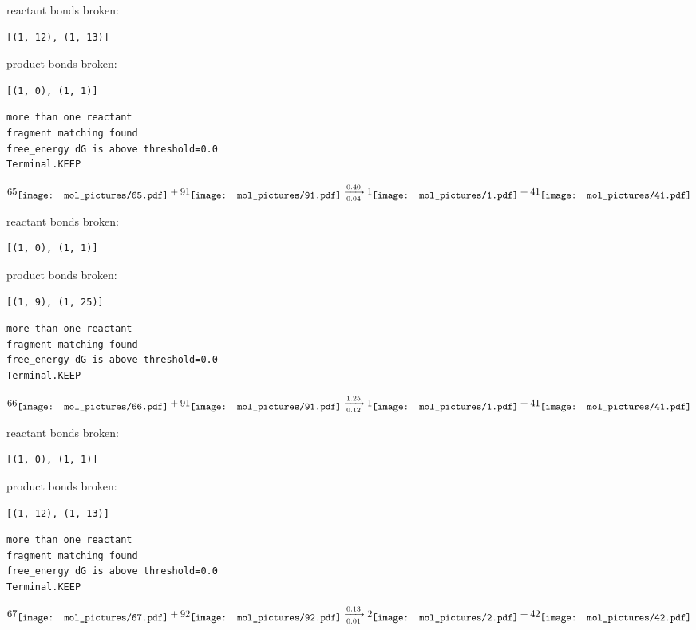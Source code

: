 \documentclass{article}
\begin{document}
reactant bonds broken:\begin{verbatim}
[(1, 12), (1, 13)]
\end{verbatim}
product bonds broken:\begin{verbatim}
[(1, 0), (1, 1)]
\end{verbatim}




\vspace{1cm}
\begin{verbatim}
more than one reactant
fragment matching found
free_energy dG is above threshold=0.0
Terminal.KEEP
\end{verbatim}
$$
65
\raisebox{-.5\height}{\texttt{[image: mol\_pictures/65.pdf]}}
+
91
\raisebox{-.5\height}{\texttt{[image: mol\_pictures/91.pdf]}}
\xrightarrow[0.04]{0.40}
1
\raisebox{-.5\height}{\texttt{[image: mol\_pictures/1.pdf]}}
+
41
\raisebox{-.5\height}{\texttt{[image: mol\_pictures/41.pdf]}}
$$


reactant bonds broken:\begin{verbatim}
[(1, 0), (1, 1)]
\end{verbatim}
product bonds broken:\begin{verbatim}
[(1, 9), (1, 25)]
\end{verbatim}




\vspace{1cm}
\begin{verbatim}
more than one reactant
fragment matching found
free_energy dG is above threshold=0.0
Terminal.KEEP
\end{verbatim}
$$
66
\raisebox{-.5\height}{\texttt{[image: mol\_pictures/66.pdf]}}
+
91
\raisebox{-.5\height}{\texttt{[image: mol\_pictures/91.pdf]}}
\xrightarrow[0.12]{1.25}
1
\raisebox{-.5\height}{\texttt{[image: mol\_pictures/1.pdf]}}
+
41
\raisebox{-.5\height}{\texttt{[image: mol\_pictures/41.pdf]}}
$$


reactant bonds broken:\begin{verbatim}
[(1, 0), (1, 1)]
\end{verbatim}
product bonds broken:\begin{verbatim}
[(1, 12), (1, 13)]
\end{verbatim}




\vspace{1cm}
\begin{verbatim}
more than one reactant
fragment matching found
free_energy dG is above threshold=0.0
Terminal.KEEP
\end{verbatim}
$$
67
\raisebox{-.5\height}{\texttt{[image: mol\_pictures/67.pdf]}}
+
92
\raisebox{-.5\height}{\texttt{[image: mol\_pictures/92.pdf]}}
\xrightarrow[0.01]{0.13}
2
\raisebox{-.5\height}{\texttt{[image: mol\_pictures/2.pdf]}}
+
42
\raisebox{-.5\height}{\texttt{[image: mol\_pictures/42.pdf]}}
$$
\end{document}
